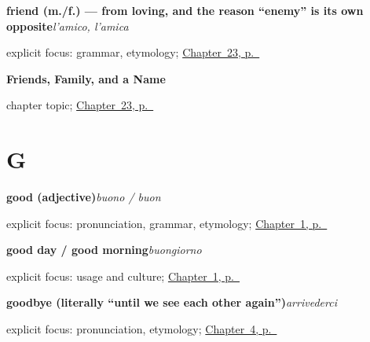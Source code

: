 \noindent\begin{minipage}[t]{\linewidth}
\raggedright
\textbf{friend (m./f.) — from loving, and the reason \textquotedblleft{}enemy\textquotedblright{} is its own opposite}\enspace\emph{l'amico, l'amica}\par
\footnotesize explicit focus: grammar, etymology; \hyperref[ch:it-friends-family-name]{Chapter~23, p.~\pageref*{ch:it-friends-family-name}}
\end{minipage}\par\smallskip

\noindent\begin{minipage}[t]{\linewidth}
\raggedright
\textbf{Friends, Family, and a Name}\par
\footnotesize chapter topic; \hyperref[ch:it-friends-family-name]{Chapter~23, p.~\pageref*{ch:it-friends-family-name}}
\end{minipage}\par\smallskip

\section*{G}

\noindent\begin{minipage}[t]{\linewidth}
\raggedright
\textbf{good (adjective)}\enspace\emph{buono / buon}\par
\footnotesize explicit focus: pronunciation, grammar, etymology; \hyperref[ch:greetings]{Chapter~1, p.~\pageref*{ch:greetings}}
\end{minipage}\par\smallskip

\noindent\begin{minipage}[t]{\linewidth}
\raggedright
\textbf{good day / good morning}\enspace\emph{buongiorno}\par
\footnotesize explicit focus: usage and culture; \hyperref[ch:greetings]{Chapter~1, p.~\pageref*{ch:greetings}}
\end{minipage}\par\smallskip

\noindent\begin{minipage}[t]{\linewidth}
\raggedright
\textbf{goodbye (literally \textquotedblleft{}until we see each other again\textquotedblright{})}\enspace\emph{arrivederci}\par
\footnotesize explicit focus: pronunciation, etymology; \hyperref[ch:it-farewells]{Chapter~4, p.~\pageref*{ch:it-farewells}}
\end{minipage}\par\smallskip


